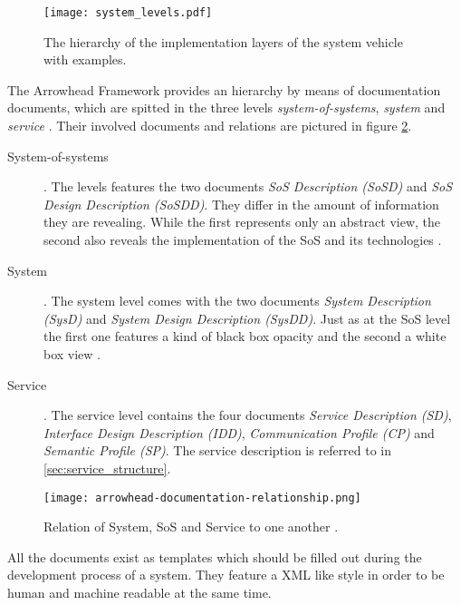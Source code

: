 \begin{figure}[!htbp]
\centering
\texttt{[image: system\_levels.pdf]}
\caption{The hierarchy of the implementation layers of the system vehicle with examples.}
\label{fig:integration_levels}
\end{figure}

The Arrowhead Framework provides an hierarchy by means of documentation documents, which are spitted in the three levels \emph{system-of-systems}, \emph{system} and \emph{service} \cite{arrowhead_inpr}. Their involved documents and relations are pictured in figure \ref{fig:sys-arrowhead}.

\begin{description}
\item [System-of-systems]. The levels features the two documents \emph{SoS Description (SoSD)} and \emph{SoS Design Description (SoSDD)}. They differ in the amount of information they are revealing. While the first represents only an abstract view, the second also reveals the implementation of the SoS and its technologies \cite{arrowhead_inpr}.
\item [System]. The system level comes with the two documents \emph{System Description (SysD)} and \emph{System Design Description (SysDD)}. Just as at the SoS level the first one features a kind of black box opacity and the second a white box view \cite{arrowhead_inpr}.
\item [Service]. The service level contains the four documents \emph{Service Description (SD)}, \emph{Interface Design Description (IDD)}, \emph{Communication Profile (CP)} and \emph{Semantic Profile (SP)}. The service description is referred to in \ref{sec:service_structure}.
\end{description}

\begin{figure}[!htbp]
\centering
\texttt{[image: arrowhead-documentation-relationship.png]}
\caption{Relation of System, SoS and Service to one another \cite{arrowhead:presentation}.}
\label{fig:sys-arrowhead}
\end{figure}

All the documents exist as templates which should be filled out during the development process of a system. They feature a XML like style in order to be human and machine readable at the same time.

